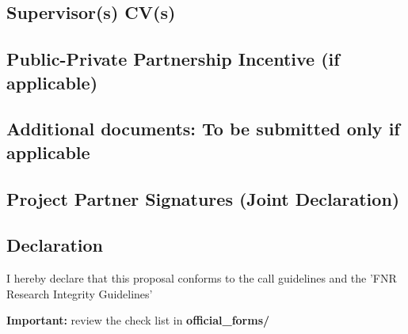 \documentclass[11pt,twoside,a4paper]{article}
\begin{document}
\subsection{Supervisor(s) CV(s)}



\subsection{Public-Private Partnership Incentive (if applicable)}


\subsection{Additional documents: To be submitted only if applicable}


\subsection{Project Partner Signatures (Joint Declaration)}


\subsection{Declaration}


I hereby declare that this proposal conforms to the call guidelines and the 'FNR
Research Integrity Guidelines' 

\textbf{Important:} review the check list in \textbf{official\_forms/}
\end{document}
